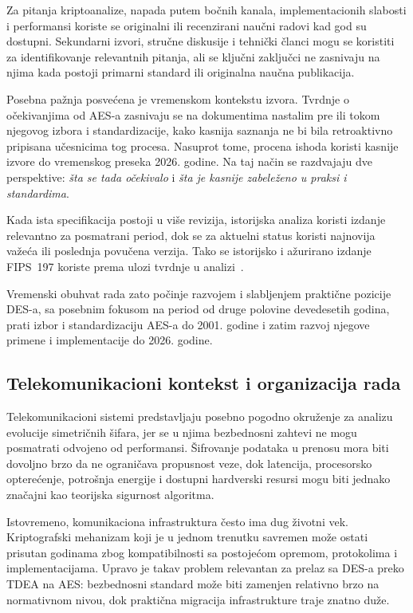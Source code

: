 Za pitanja kriptoanalize, napada putem bočnih kanala, implementacionih
slabosti i performansi koriste se originalni ili recenzirani naučni
radovi kad god su dostupni. Sekundarni izvori, stručne diskusije i
tehnički članci mogu se koristiti za identifikovanje relevantnih
pitanja, ali se ključni zaključci ne zasnivaju na njima kada postoji
primarni standard ili originalna naučna publikacija.

Posebna pažnja posvećena je vremenskom kontekstu izvora. Tvrdnje o
očekivanjima od AES-a zasnivaju se na dokumentima nastalim pre ili
tokom njegovog izbora i standardizacije, kako kasnija saznanja ne bi
bila retroaktivno pripisana učesnicima tog procesa. Nasuprot tome,
procena ishoda koristi kasnije izvore do vremenskog preseka 2026.
godine. Na taj način se razdvajaju dve perspektive:
\emph{šta se tada očekivalo} i \emph{šta je kasnije zabeleženo u
praksi i standardima}.

Kada ista specifikacija postoji u više revizija, istorijska analiza
koristi izdanje relevantno za posmatrani period, dok se za aktuelni
status koristi najnovija važeća ili poslednja povučena verzija.
Tako se istorijsko i ažurirano izdanje FIPS~197 koriste prema ulozi
tvrdnje u analizi~\cite{fips197-2023}.

Vremenski obuhvat rada zato počinje razvojem i slabljenjem praktične
pozicije DES-a, sa posebnim fokusom na period od druge polovine
devedesetih godina, prati izbor i standardizaciju AES-a do 2001.
godine i zatim razvoj njegove primene i implementacije do 2026.
godine.


\subsection{Telekomunikacioni kontekst i organizacija rada}
\label{subsec:telekom_kontekst}

Telekomunikacioni sistemi predstavljaju posebno pogodno okruženje za
analizu evolucije simetričnih šifara, jer se u njima bezbednosni zahtevi
ne mogu posmatrati odvojeno od performansi. Šifrovanje podataka u
prenosu mora biti dovoljno brzo da ne ograničava propusnost veze, dok
latencija, procesorsko opterećenje, potrošnja energije i dostupni
hardverski resursi mogu biti jednako značajni kao teorijska sigurnost
algoritma.

Istovremeno, komunikaciona infrastruktura često ima dug životni vek.
Kriptografski mehanizam koji je u jednom trenutku savremen može ostati
prisutan godinama zbog kompatibilnosti sa postojećom opremom,
protokolima i implementacijama. Upravo je takav problem relevantan za
prelaz sa DES-a preko TDEA na AES: bezbednosni standard može
biti zamenjen relativno brzo na normativnom nivou, dok praktična
migracija infrastrukture traje znatno duže.

